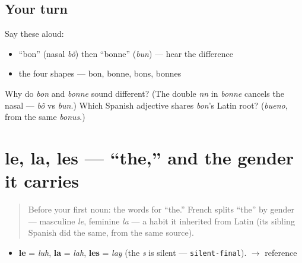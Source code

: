 \subsection*{Your turn}
Say these aloud:

\begin{itemize}
\raggedright
  \item \textquotedblleft{}bon\textquotedblright{} (nasal \emph{bõ}) then \textquotedblleft{}bonne\textquotedblright{} (\emph{bun}) — hear the difference
  \item the four shapes — bon, bonne, bons, bonnes
\end{itemize}

\begin{tcolorbox}[breakable,colback=teal!4,colframe=teal!35!black,title={Before you move on}]
Why do \emph{bon} and \emph{bonne} sound different? (The double \emph{nn} in \emph{bonne} cancels the nasal — \emph{bõ} vs \emph{bun}.) Which Spanish adjective shares \emph{bon}'s Latin root? (\emph{bueno}, from the same \emph{bonus}.)
\end{tcolorbox}
\section[le / la / les]{le, la, les — \textquotedblleft{}the,\textquotedblright{} and the gender it carries}

\label{lesson:FR-C01-le-la}



\begin{quote}
Before your first noun: the words for \textquotedblleft{}the.\textquotedblright{} French splits \textquotedblleft{}the\textquotedblright{} by gender — masculine \emph{le}, feminine \emph{la} — a habit it inherited from Latin (its sibling Spanish did the same, from the same source).
\end{quote}

\begin{sounds}
\begin{itemize}
\raggedright
  \item \textbf{le} = \emph{luh}, \textbf{la} = \emph{lah}, \textbf{les} = \emph{lay} (the \emph{s} is silent — \texttt{silent-final}). $\to$ reference
\end{itemize}
\end{sounds}

